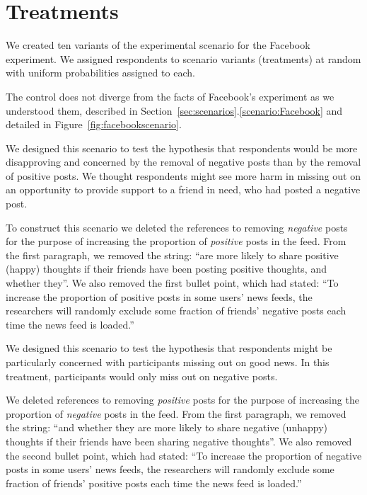 \section{Treatments}

We created ten variants of the experimental scenario for the Facebook experiment.  We assigned respondents to scenario variants (treatments) at random with uniform probabilities assigned to each.

The control does not diverge from the facts of Facebook's experiment as we understood them, described in Section~\ref{sec:scenarios}.\ref{scenario:Facebook} and detailed in Figure~\ref{fig:facebookscenario}.

We designed this scenario to test the hypothesis that respondents would be more disapproving and concerned by the removal of negative posts than by the removal of positive posts.  We thought respondents might see more harm in missing out on an opportunity to provide support to a friend in need, who had posted a negative post.

To construct this scenario we deleted the references to removing \textit{negative} posts for the purpose of increasing the proportion of \textit{positive} posts in the feed.  From the first paragraph, we removed the string: ``are more likely to share positive (happy) thoughts if their friends have been posting positive thoughts, and whether they''.  We also removed the first bullet point, which had stated: ``To increase the proportion of positive posts in some users' news feeds, the researchers will randomly exclude some fraction of friends' negative posts each time the news feed is loaded.''

We designed this scenario to test the hypothesis that respondents might be particularly concerned with participants missing out on good news.  In this treatment, participants would only miss out on negative posts.

We deleted references to removing \textit{positive} posts for the purpose of increasing the proportion of \textit{negative} posts in the feed.  From the first paragraph, we removed the string: ``and whether they are more likely to share negative (unhappy) thoughts if their friends have been sharing negative thoughts''.  We also removed the second bullet point, which had stated: ``To increase the proportion of negative posts in some users' news feeds, the researchers will randomly exclude some fraction of friends' positive posts each time the news feed is loaded.''


